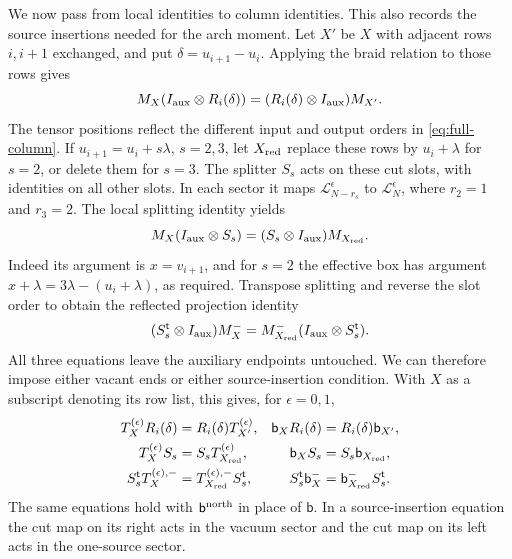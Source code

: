 We now pass from local identities to column identities. This also
records the source insertions needed for the arch moment. Let $X'$ be
$X$ with adjacent rows $i,i+1$ exchanged, and put
$\delta=u_{i+1}-u_i$. Applying the braid relation to those rows gives
\begin{equation}\label{eq:column-exchange}
 M_X(I_{\rm aux}\otimes R_i(\delta))
 =(R_i(\delta)\otimes I_{\rm aux})M_{X'}.
\end{equation}
The tensor positions reflect the different input and output orders
in \eqref{eq:full-column}.
If $u_{i+1}=u_i+s\lambda$, $s=2,3$, let $X_{\rm red}$ replace these
rows by $u_i+\lambda$ for $s=2$, or delete them for $s=3$.
The splitter $S_s$ acts on these cut slots, with identities on all
other slots. In each sector it maps
$\mathcal L_{N-r_s}^\epsilon$ to $\mathcal L_N^\epsilon$, where
$r_2=1$ and $r_3=2$. The local splitting identity yields
\begin{equation}\label{eq:column-splitting}
 M_X(I_{\rm aux}\otimes S_s)
 =(S_s\otimes I_{\rm aux})M_{X_{\rm red}}.
\end{equation}
Indeed its argument is $x=v_{i+1}$, and for $s=2$ the effective box
has argument $x+\lambda=3\lambda-(u_i+\lambda)$, as required.
Transpose splitting and reverse the slot order to obtain the reflected
projection identity
\begin{equation}\label{eq:column-reflection}
 (S_s^{\mathsf t}\otimes I_{\rm aux})M_X^-
 =M_{X_{\rm red}}^-(I_{\rm aux}\otimes S_s^{\mathsf t}).
\end{equation}
All three equations leave the auxiliary endpoints untouched. We can
therefore impose either vacant ends or either source-insertion
condition. With $X$ as a subscript denoting its row list, this gives,
for $\epsilon=0,1$,
\begin{equation}\label{eq:transfer-intertwiners}
\begin{aligned}
 T_X^{(\epsilon)}R_i(\delta)&=R_i(\delta)T_{X'}^{(\epsilon)},&
 \mathsf b_XR_i(\delta)&=R_i(\delta)\mathsf b_{X'},\\
 T_X^{(\epsilon)}S_s&=S_sT_{X_{\rm red}}^{(\epsilon)},&
 \mathsf b_XS_s&=S_s\mathsf b_{X_{\rm red}},\\
 S_s^{\mathsf t}T_X^{(\epsilon),-}
 &=T_{X_{\rm red}}^{(\epsilon),-}S_s^{\mathsf t},&
 S_s^{\mathsf t}\mathsf b_X^-
 &=\mathsf b_{X_{\rm red}}^-S_s^{\mathsf t}.
\end{aligned}
\end{equation}
The same equations hold with $\mathsf b^{\rm north}$ in place of
$\mathsf b$. In a source-insertion equation the cut map on its right
acts in the vacuum sector and the cut map on its left acts in the
one-source sector.

